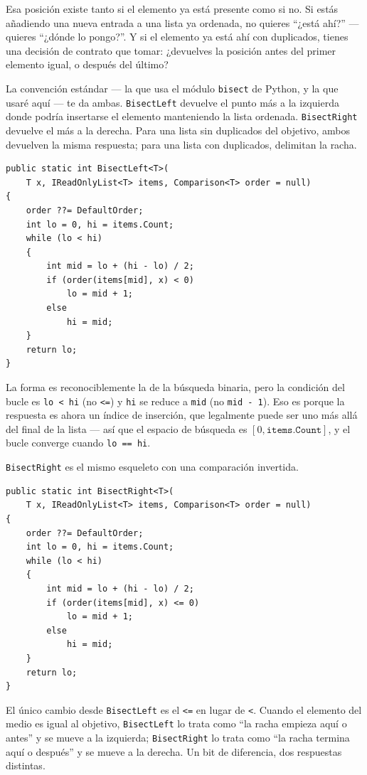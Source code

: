 \documentclass[11pt,a4paper]{article}
\begin{document}
Esa posición existe tanto si el elemento ya está presente como si no. Si estás añadiendo una nueva entrada a una lista ya ordenada, no quieres ``¿está ahí?'' --- quieres ``¿dónde lo pongo?''. Y si el elemento ya está ahí con duplicados, tienes una decisión de contrato que tomar: ¿devuelves la posición antes del primer elemento igual, o después del último?

La convención estándar --- la que usa el módulo \texttt{bisect} de Python, y la que usaré aquí --- te da ambas. \texttt{BisectLeft} devuelve el punto más a la izquierda donde podría insertarse el elemento manteniendo la lista ordenada. \texttt{BisectRight} devuelve el más a la derecha. Para una lista sin duplicados del objetivo, ambos devuelven la misma respuesta; para una lista con duplicados, delimitan la racha.

\begin{lstlisting}[caption={\texttt{BisectLeft}: inserción más a la izquierda}]
public static int BisectLeft<T>(
    T x, IReadOnlyList<T> items, Comparison<T> order = null)
{
    order ??= DefaultOrder;
    int lo = 0, hi = items.Count;
    while (lo < hi)
    {
        int mid = lo + (hi - lo) / 2;
        if (order(items[mid], x) < 0)
            lo = mid + 1;
        else
            hi = mid;
    }
    return lo;
}
\end{lstlisting}

La forma es reconociblemente la de la búsqueda binaria, pero la condición del bucle es \texttt{lo < hi} (no \texttt{<=}) y \texttt{hi} se reduce a \texttt{mid} (no \texttt{mid - 1}). Eso es porque la respuesta es ahora un índice de inserción, que legalmente puede ser uno más allá del final de la lista --- así que el espacio de búsqueda es $[0, \texttt{items.Count}]$, y el bucle converge cuando \texttt{lo == hi}.

\texttt{BisectRight} es el mismo esqueleto con una comparación invertida.

\begin{lstlisting}[caption={\texttt{BisectRight}: inserción más a la derecha}]
public static int BisectRight<T>(
    T x, IReadOnlyList<T> items, Comparison<T> order = null)
{
    order ??= DefaultOrder;
    int lo = 0, hi = items.Count;
    while (lo < hi)
    {
        int mid = lo + (hi - lo) / 2;
        if (order(items[mid], x) <= 0)
            lo = mid + 1;
        else
            hi = mid;
    }
    return lo;
}
\end{lstlisting}

El único cambio desde \texttt{BisectLeft} es el \texttt{<=} en lugar de \texttt{<}. Cuando el elemento del medio es igual al objetivo, \texttt{BisectLeft} lo trata como ``la racha empieza aquí o antes'' y se mueve a la izquierda; \texttt{BisectRight} lo trata como ``la racha termina aquí o después'' y se mueve a la derecha. Un bit de diferencia, dos respuestas distintas.
\end{document}
